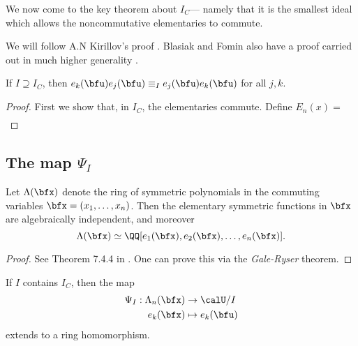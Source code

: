 \documentclass{article}
\begin{document}
We now come to the key theorem about $I_C$--- namely that it is the smallest ideal which allows the noncommutative elementaries to commute.

We will follow A.N Kirillov's proof \cite[Theorem 2.26]{K16}.
Blasiak and Fomin also have a proof carried out in much higher generality \cite{BF18}.

\begin{theorem}
    \label{thm:ICImpliesEsCommute}
    If $I \supseteq I_C$, then $e_k(\bfu)e_j(\bfu) \equiv_I e_j(\bfu)e_k(\bfu)$ for all $j,k$. 
\end{theorem}

\begin{proof}
    First we show that, in $I_C$, the elementaries commute.
    Define $E_n(x) = $
    \begin{align*}
    \end{align*}
\end{proof}

\subsection{
    The map \texorpdfstring{$\Psi_I$}{Psi\_I}
}

\begin{theorem}
    \label{thm:FundThmSymFuncs}
    Let $\Lambda(\bfx)$ denote the ring of symmetric polynomials in the commuting variables $\bfx = (x_1,\ldots,x_n)$.
    Then the elementary symmetric functions in $\bfx$ are algebraically independent, and moreover
    \[
        \Lambda(\bfx)
        \simeq
        \QQ[e_1(\bfx), e_2(\bfx), \ldots, e_n(\bfx)].
    \]
\end{theorem}

\begin{proof}
    See Theorem 7.4.4 in \cite{EC2}.
    One can prove this via the \textit{Gale-Ryser} theorem.
\end{proof}

\begin{corollary}
    If $I$ contains $I_C$, then the map
    \begin{align*}
        \Psi_I:
        \Lambda_n(\bfx)
        &\to
        \calU/I
        \\
        e_k(\bfx)
        &\mapsto
        e_k(\bfu)
    \end{align*}
    extends to a ring homomorphism.
\end{corollary}
\end{document}
